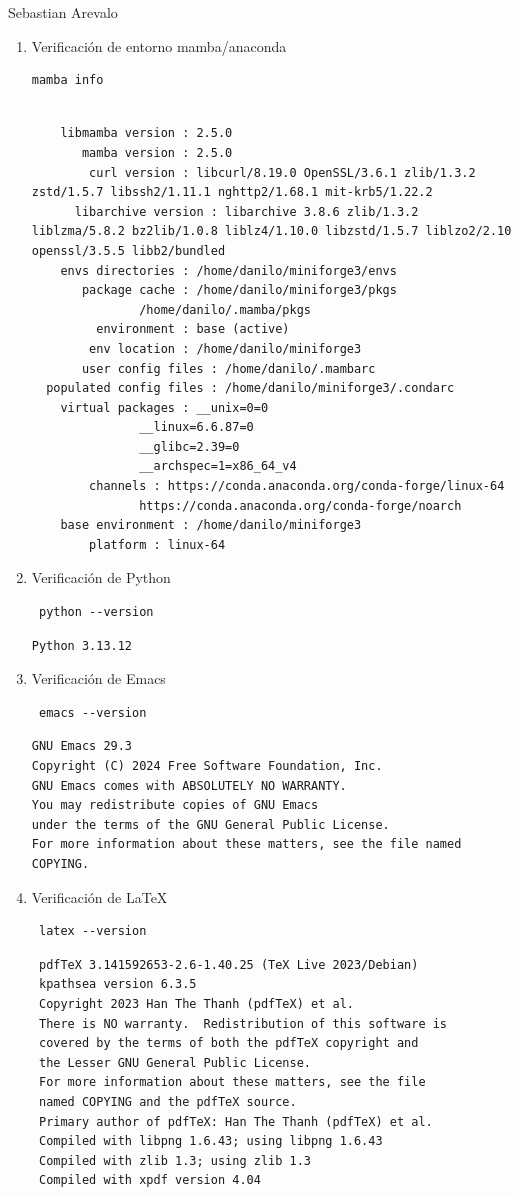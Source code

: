 \documentclass[11pt]{article}
\begin{document}
Sebastian Arevalo
\begin{enumerate}
\item Verificación de entorno mamba/anaconda
\begin{verbatim}
mamba info
\end{verbatim}

\begin{verbatim}

	libmamba version : 2.5.0
	   mamba version : 2.5.0
	    curl version : libcurl/8.19.0 OpenSSL/3.6.1 zlib/1.3.2 zstd/1.5.7 libssh2/1.11.1 nghttp2/1.68.1 mit-krb5/1.22.2
      libarchive version : libarchive 3.8.6 zlib/1.3.2 liblzma/5.8.2 bz2lib/1.0.8 liblz4/1.10.0 libzstd/1.5.7 liblzo2/2.10 openssl/3.5.5 libb2/bundled
	envs directories : /home/danilo/miniforge3/envs
	   package cache : /home/danilo/miniforge3/pkgs
			   /home/danilo/.mamba/pkgs
	     environment : base (active)
	    env location : /home/danilo/miniforge3
       user config files : /home/danilo/.mambarc
  populated config files : /home/danilo/miniforge3/.condarc
	virtual packages : __unix=0=0
			   __linux=6.6.87=0
			   __glibc=2.39=0
			   __archspec=1=x86_64_v4
		channels : https://conda.anaconda.org/conda-forge/linux-64
			   https://conda.anaconda.org/conda-forge/noarch
	base environment : /home/danilo/miniforge3
		platform : linux-64
\end{verbatim}
\item Verificación de Python
\begin{verbatim}
 python --version
\end{verbatim}

\begin{verbatim}
Python 3.13.12
\end{verbatim}
\item Verificación de Emacs
\begin{verbatim}
 emacs --version
\end{verbatim}

\begin{verbatim}
GNU Emacs 29.3
Copyright (C) 2024 Free Software Foundation, Inc.
GNU Emacs comes with ABSOLUTELY NO WARRANTY.
You may redistribute copies of GNU Emacs
under the terms of the GNU General Public License.
For more information about these matters, see the file named COPYING.
\end{verbatim}
\item Verificación de \LaTeX{}
\begin{verbatim}
 latex --version
\end{verbatim}

\begin{verbatim}
 pdfTeX 3.141592653-2.6-1.40.25 (TeX Live 2023/Debian)
 kpathsea version 6.3.5
 Copyright 2023 Han The Thanh (pdfTeX) et al.
 There is NO warranty.  Redistribution of this software is
 covered by the terms of both the pdfTeX copyright and
 the Lesser GNU General Public License.
 For more information about these matters, see the file
 named COPYING and the pdfTeX source.
 Primary author of pdfTeX: Han The Thanh (pdfTeX) et al.
 Compiled with libpng 1.6.43; using libpng 1.6.43
 Compiled with zlib 1.3; using zlib 1.3
 Compiled with xpdf version 4.04
\end{verbatim}
\end{enumerate}
\end{document}
